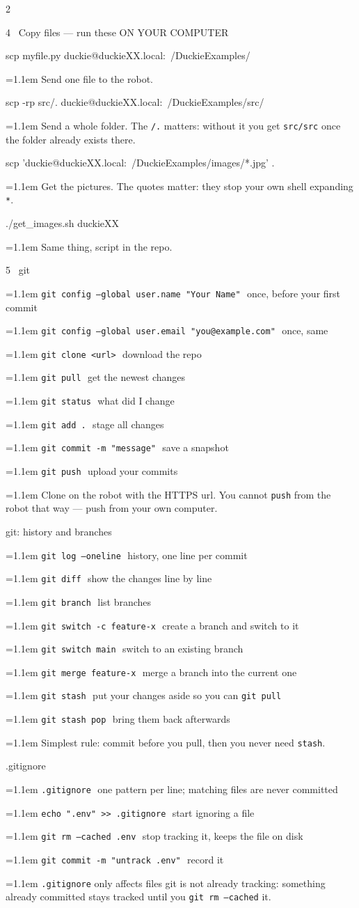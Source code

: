 \documentclass[10pt,a4paper]{extarticle}
\newcommand{\code}[1]{\textcolor{accentd}{\texttt{#1}}}
\newcommand{\ce}[2]{\par\hangindent=1.1em\hangafter=1
  \code{#1}\,\textcolor{dim}{\small\textemdash\ #2}\par\vspace{0.5pt}}
\newcommand{\nt}[1]{\par\hangindent=1.1em\hangafter=1
  \textcolor{dim}{\small #1}\par\vspace{0.5pt}}
\begin{document}
\begin{multicols}{2}
\begin{sect}{4 \ Copy files --- run these ON YOUR COMPUTER}
\begin{cmd}
scp myfile.py duckie@duckieXX.local:~/DuckieExamples/
\end{cmd}
\nt{Send one file to the robot.}
\begin{cmd}
scp -rp src/. duckie@duckieXX.local:~/DuckieExamples/src/
\end{cmd}
\nt{Send a whole folder. The \code{/.} matters: without it you get \code{src/src} once the folder already exists there.}
\begin{cmd}
scp 'duckie@duckieXX.local:~/DuckieExamples/images/*.jpg' .
\end{cmd}
\nt{Get the pictures. The quotes matter: they stop your own shell expanding \code{*}.}
\begin{cmd}
./get_images.sh duckieXX
\end{cmd}
\nt{Same thing, script in the repo.}
\end{sect}

\begin{sect}{5 \ git}
\ce{git config --global user.name "Your Name"}{once, before your first commit}
\ce{git config --global user.email "you@example.com"}{once, same}
\ce{git clone <url>}{download the repo}
\ce{git pull}{get the newest changes}
\ce{git status}{what did I change}
\ce{git add .}{stage all changes}
\ce{git commit -m "message"}{save a snapshot}
\ce{git push}{upload your commits}
\nt{Clone on the robot with the HTTPS url. You cannot \code{push} from the robot that way --- push from your own computer.}
\end{sect}

\begin{sect}{git: history and branches}
\ce{git log --oneline}{history, one line per commit}
\ce{git diff}{show the changes line by line}
\ce{git branch}{list branches}
\ce{git switch -c feature-x}{create a branch and switch to it}
\ce{git switch main}{switch to an existing branch}
\ce{git merge feature-x}{merge a branch into the current one}
\ce{git stash}{put your changes aside so you can \code{git pull}}
\ce{git stash pop}{bring them back afterwards}
\nt{Simplest rule: commit before you pull, then you never need \code{stash}.}
\end{sect}

\begin{sect}{.gitignore}
\ce{.gitignore}{one pattern per line; matching files are never committed}
\ce{echo ".env" >> .gitignore}{start ignoring a file}
\ce{git rm --cached .env}{stop tracking it, keeps the file on disk}
\ce{git commit -m "untrack .env"}{record it}
\nt{\code{.gitignore} only affects files git is not already tracking: something already committed stays tracked until you \code{git rm --cached} it.}
\end{sect}


\end{multicols}
\end{document}
